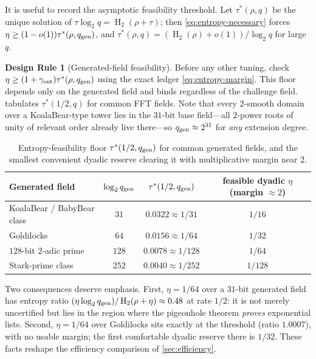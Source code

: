 \documentclass[11pt]{article}
\theoremstyle{definition}
\newtheorem{designrule}[theorem]{Design Rule}
\newcommand{\Hbin}{\operatorname{H}_2}
\newcommand{\taustar}{\tau^{*}}
\newcommand{\qgen}{q_{\rm gen}}
\begin{document}
It is useful to record the asymptotic feasibility threshold.  Let $\taustar(\rho,q)$ be the unique solution of $\tau\log_2q=\Hbin(\rho+\tau)$; then \eqref{eq:entropy-necessary} forces $\eta\ge(1-o(1))\taustar(\rho,\qgen)$, and $\taustar(\rho,q)=(\Hbin(\rho)+o(1))/\log_2q$ for large $q$.

\begin{designrule}[Generated-field feasibility]
\label{rule:entropy-feasibility}
Before any other tuning, check $\eta\ge(1+\gamma_{\rm ent})\taustar(\rho,\qgen)$ using the exact ledger \eqref{eq:entropy-margin}.  This floor depends only on the generated field and binds regardless of the challenge field.   tabulates $\taustar(1/2,q)$ for common FFT fields.  Note that every $2$-smooth domain over a KoalaBear-type tower lies in the $31$-bit base field---all $2$-power roots of unity of relevant order already live there---so $\qgen\approx2^{31}$ for \emph{any} extension degree.
\end{designrule}

\begin{table}[ht]\centering\small
\caption{Entropy-feasibility floor $\taustar(1/2,\qgen)$ for common generated fields, and the smallest convenient dyadic reserve clearing it with multiplicative margin near $2$.}
\label{tab:feasibility}
\begin{tabular}{lccc}
\toprule
Generated field & $\log_2\qgen$ & $\taustar(1/2,\qgen)$ & feasible dyadic $\eta$ (margin $\approx2$) \\
\midrule
KoalaBear / BabyBear class & $31$ & $0.0322\approx1/31$ & $1/16$ \\
Goldilocks & $64$ & $0.0156\approx1/64$ & $1/32$ \\
$128$-bit $2$-adic prime & $128$ & $0.0078\approx1/128$ & $1/64$ \\
Stark-prime class & $252$ & $0.0040\approx1/252$ & $1/128$ \\
\bottomrule
\end{tabular}
\end{table}

Two consequences deserve emphasis.  First, $\eta=1/64$ over a $31$-bit generated field has entropy ratio $(\eta\log_2\qgen)/\Hbin(\rho+\eta)\approx0.48$ at rate $1/2$: it is not merely uncertified but lies in the region where the pigeonhole theorem \emph{proves} exponential lists.  Second, $\eta=1/64$ over Goldilocks sits exactly at the threshold (ratio $1.0007$), with no usable margin; the first comfortable dyadic reserve there is $1/32$.  These facts reshape the efficiency comparison of \cref{sec:efficiency}.
\end{document}
